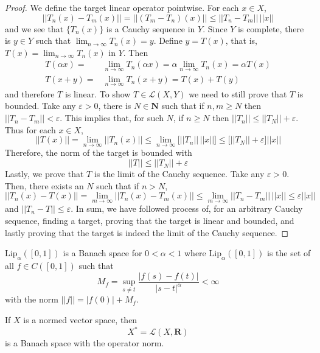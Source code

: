 \begin{proof}
We define the target linear operator pointwise. For each $x\in X$, 
\[||T_{n}(x)-T_{m}(x)||=||(T_{m}-T_{n})(x)||\leq ||T_{n}-T_{m}||\, ||x||\] 
and we see that $\{T_{n}(x)\}$ is a Cauchy sequence in $Y$. Since $Y$ is complete, there is $y\in Y$ such that $\lim _{n\rightarrow \infty }T_{n}(x)=y$. Define $y=T(x)$, that is, $T(x)=\lim _{n\rightarrow \infty }T_{n}(x)$ in $Y$. Then 
\begin{align*}
T(\alpha x)=&\lim _{n\rightarrow \infty }T_{n}(\alpha x)=\alpha\lim _{n\rightarrow \infty } T_{n}(x)=\alpha T(x)\\
T(x+y)=&\lim _{n\rightarrow \infty }T_{n}(x+y)=T(x)+T(y)
\end{align*}
and therefore $T$ is linear. To show $T\in \mathcal{L}(X,Y)$ we need to still prove that $T$ is bounded. Take any $\varepsilon >0$, there is $N\in {\bm N}$ such that if $n,m\geq N$ then $||T_{n}-T_{m}||<\varepsilon $. This implies that, for such $N$, if $n\geq N$ then $||T_{n}||\leq ||T_{N}||+\varepsilon $. Thus for each $x\in X$,
\[||T(x)||=\lim _{n\rightarrow \infty }||T_{n}(x)||\leq \lim _{n\rightarrow \infty }\Big[||T_{n}||\,||x||\Big]\leq \Big[||T_{N}||+\varepsilon \Big]||x||\]
Therefore, the norm of the target is bounded with
\[||T||\leq ||T_{N}||+\varepsilon \]
Lastly, we prove that $T$ is the limit of the Cauchy sequence. Take any $\varepsilon >0$. Then, there exists an $N$ such that if $n>N$, 
\[||T_{n}(x)-T(x)||=\lim _{m\rightarrow \infty }||T_{n}(x)-T_{m}(x)||\leq \lim _{m\rightarrow \infty }||T_{n}-T_{m}||\,||x||\leq \varepsilon ||x||\]
and $||T_{n}-T||\leq \varepsilon $. In sum, we have followed process of, for an arbitrary Cauchy sequence, finding a target, proving that the target is linear and bounded, and lastly proving that the target is indeed the limit of the Cauchy sequence. 
\end{proof}
\vspace{2ex}
\begin{prop}
$\mathrm{Lip}_{\alpha }([0,1])$ is a Banach space for $0<\alpha <1$ where $\mathrm{Lip}_{\alpha }([0,1])$ is the set of all $f\in C([0,1])$ such that
\[M_{f}=\sup_{s\ne t}\dfrac{|f(s)-f(t)|}{|s-t|^{\alpha }}<\infty \]
with the norm $||f||=|f(0)|+M_{f}$. 
\end{prop}
\vspace{2ex}
\begin{cor}
If $X$ is a normed vector space, then
\[X^{*}=\mathcal{L}(X,{\bm R})\]
is a Banach space with the operator norm. 
\end{cor}
